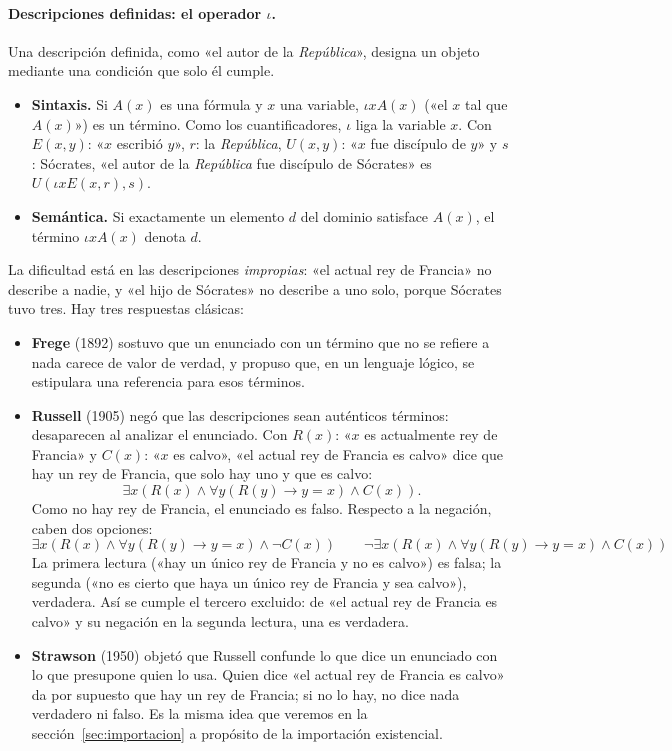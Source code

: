 \paragraph{Descripciones definidas: el operador $\iota$.} Una descripción definida, como «el autor de la \emph{República}», designa un objeto mediante una condición que solo él cumple.
\begin{itemize}
    \item \textbf{Sintaxis.} Si $A(x)$ es una fórmula y $x$ una variable, $\iota x A(x)$ («el $x$ tal que $A(x)$») es un término. Como los cuantificadores, $\iota$ liga la variable $x$. Con $E(x, y)$: «$x$ escribió $y$», $r$: la \emph{República}, $U(x, y)$: «$x$ fue discípulo de $y$» y $s$: Sócrates, «el autor de la \emph{República} fue discípulo de Sócrates» es $U(\iota x E(x, r), s)$.
    \item \textbf{Semántica.} Si exactamente un elemento $d$ del dominio satisface $A(x)$, el término $\iota x A(x)$ denota $d$.
\end{itemize}
La dificultad está en las descripciones \emph{impropias}: «el actual rey de Francia» no describe a nadie, y «el hijo de Sócrates» no describe a uno solo, porque Sócrates tuvo tres. Hay tres respuestas clásicas:
\begin{itemize}
    \item \textbf{Frege} (1892) sostuvo que un enunciado con un término que no se refiere a nada carece de valor de verdad, y propuso que, en un lenguaje lógico, se estipulara una referencia para esos términos.
    \item \textbf{Russell} (1905) negó que las descripciones sean auténticos términos: desaparecen al analizar el enunciado. Con $R(x)$: «$x$ es actualmente rey de Francia» y $C(x)$: «$x$ es calvo», «el actual rey de Francia es calvo» dice que hay un rey de Francia, que solo hay uno y que es calvo:
    \[
    \exists x (R(x) \land \forall y (R(y) \to y = x) \land C(x)).
    \]
    Como no hay rey de Francia, el enunciado es falso. Respecto a la
    negación, caben dos opciones: 
    \[
    \exists x (R(x) \land \forall y (R(y) \to y = x) \land \neg C(x)) \qquad \neg \exists x (R(x) \land \forall y (R(y) \to y = x) \land C(x))
    \]
    La primera lectura («hay un único rey de Francia y no es calvo»)
    es falsa; la segunda («no es cierto que haya un único rey de
    Francia y sea calvo»), verdadera. Así se cumple el tercero
    excluido: de «el actual rey de Francia es calvo» y su negación en
    la segunda lectura, una es verdadera. 
    \item \textbf{Strawson} (1950) objetó que Russell confunde lo que dice un enunciado con lo que presupone quien lo usa. Quien dice «el actual rey de Francia es calvo» da por supuesto que hay un rey de Francia; si no lo hay, no dice nada verdadero ni falso. Es la misma idea que veremos en la sección~\ref{sec:importacion} a propósito de la importación existencial.
\end{itemize}
